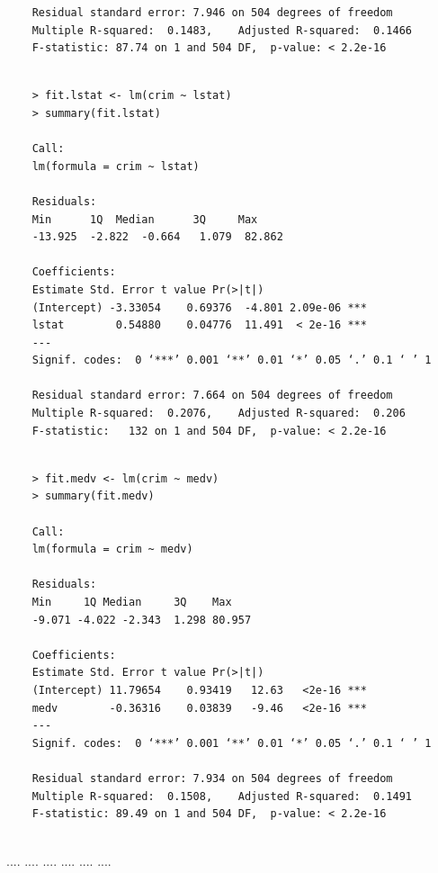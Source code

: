 \documentclass{article}
\begin{document}
\begin{itemize}
\begin{program}
\begin{verbatim}
	Residual standard error: 7.946 on 504 degrees of freedom
	Multiple R-squared:  0.1483,	Adjusted R-squared:  0.1466 
	F-statistic: 87.74 on 1 and 504 DF,  p-value: < 2.2e-16
	
	\end{verbatim}
\end{program}


\begin{program}
	\begin{verbatim}
	> fit.lstat <- lm(crim ~ lstat)
	> summary(fit.lstat)
	
	Call:
	lm(formula = crim ~ lstat)
	
	Residuals:
	Min      1Q  Median      3Q     Max 
	-13.925  -2.822  -0.664   1.079  82.862 
	
	Coefficients:
	Estimate Std. Error t value Pr(>|t|)    
	(Intercept) -3.33054    0.69376  -4.801 2.09e-06 ***
	lstat        0.54880    0.04776  11.491  < 2e-16 ***
	---
	Signif. codes:  0 ‘***’ 0.001 ‘**’ 0.01 ‘*’ 0.05 ‘.’ 0.1 ‘ ’ 1
	
	Residual standard error: 7.664 on 504 degrees of freedom
	Multiple R-squared:  0.2076,	Adjusted R-squared:  0.206 
	F-statistic:   132 on 1 and 504 DF,  p-value: < 2.2e-16
	
	\end{verbatim}
\end{program}


\begin{program}
	\begin{verbatim}
	> fit.medv <- lm(crim ~ medv)
	> summary(fit.medv)
	
	Call:
	lm(formula = crim ~ medv)
	
	Residuals:
	Min     1Q Median     3Q    Max 
	-9.071 -4.022 -2.343  1.298 80.957 
	
	Coefficients:
	Estimate Std. Error t value Pr(>|t|)    
	(Intercept) 11.79654    0.93419   12.63   <2e-16 ***
	medv        -0.36316    0.03839   -9.46   <2e-16 ***
	---
	Signif. codes:  0 ‘***’ 0.001 ‘**’ 0.01 ‘*’ 0.05 ‘.’ 0.1 ‘ ’ 1
	
	Residual standard error: 7.934 on 504 degrees of freedom
	Multiple R-squared:  0.1508,	Adjusted R-squared:  0.1491 
	F-statistic: 89.49 on 1 and 504 DF,  p-value: < 2.2e-16
	
	\end{verbatim}
\end{program}


\newpage
....
\newpage
....
\newpage
....
\newpage
....
\newpage
....
\newpage
....
\newpage


\end{itemize}
\end{document}
